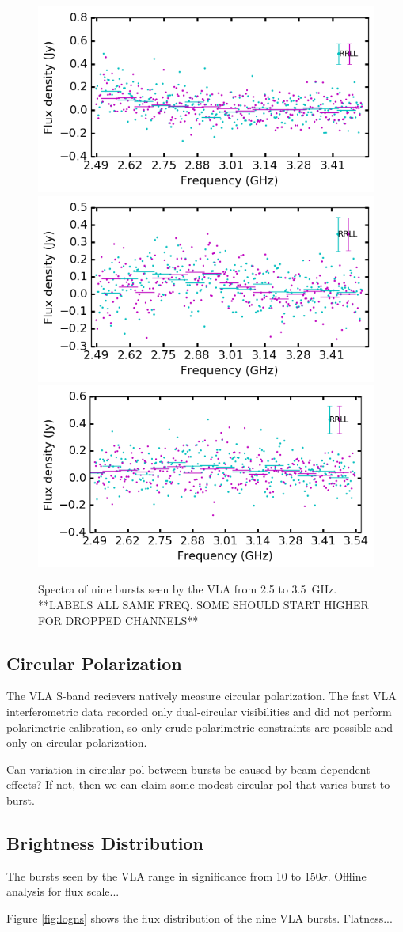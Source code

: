 \documentclass{emulateapj}
\begin{document}
\begin{figure}[h!]
\begin{center}
 \begin{minipage}{2\columnwidth}
  \includegraphics[width=0.3\columnwidth]{spec_57646.png}
  \includegraphics[width=0.3\columnwidth]{spec_57648.png}
  \includegraphics[width=0.3\columnwidth]{spec_57649.png}
 \end{minipage}
\caption{Spectra of nine bursts seen by the VLA from 2.5 to 3.5~GHz.  **LABELS ALL SAME FREQ. SOME SHOULD START HIGHER FOR DROPPED CHANNELS**
 \label{fig:spec}}
\end{center}
\end{figure}


\subsection{Circular Polarization}

The VLA S-band recievers natively measure circular polarization. The fast VLA interferometric data recorded only dual-circular visibilities and did not perform polarimetric calibration, so only crude polarimetric constraints are possible and only on circular polarization.

Can variation in circular pol between bursts be caused by beam-dependent effects? If not, then we can claim some modest circular pol that varies burst-to-burst.

\subsection{Brightness Distribution}

The bursts seen by the VLA range in significance from 10 to 150$\sigma$. Offline analysis for flux scale...

Figure \ref{fig:logns} shows the flux distribution of the nine VLA bursts. Flatness...
\end{document}

